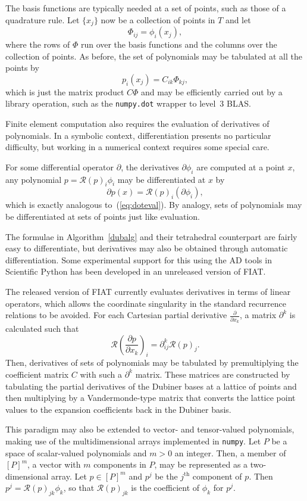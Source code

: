 The basis functions are typically needed at a set of points, such as
those of a quadrature rule.  Let \( \{ x_j \} \) now be a collection of
points in \( T \) and let
\[
  \Phi_{ij} = \phi_i(x_j),
\]
where the rows of \( \Phi \) run over the basis functions and the columns
over the collection of points.  As before, the set of polynomials may
be tabulated at all the points by
\[
p_i(x_j) = C_{ik} \Phi_{kj},
\]
which is just the matrix product \( C \Phi \) and may be efficiently
carried out by a library operation, such as the \texttt{numpy.dot}
wrapper to level~3 BLAS.

Finite element computation also requires the evaluation of derivatives
of polynomials.  In a symbolic context, differentiation presents no
particular difficulty, but working in a numerical context requires some
special care.

For some differential operator \( \partial \), the derivatives \(
\partial \phi_i \) are computed at a point \( x \), any polynomial \(
p = \mathcal{R}(p)_i \phi_i \) may be differentiated at \( x \) by
\[
\partial p(x) = \mathcal{R}(p)_i (\partial \phi_i),
\]
which is exactly analogous to~(\ref{eq:doteval}).  By analogy, sets of
polynomials may be differentiated at sets of points just like evaluation.

The formulae in Algorithm~\ref{dubalg} and their tetrahedral counterpart
are fairly easy to differentiate, but derivatives may also be obtained
through automatic differentiation.  Some experimental support for
this using the AD tools in Scientific Python has been developed in an
unreleased version of FIAT.

The released version of FIAT currently evaluates derivatives in terms
of linear operators, which allows the coordinate singularity in the
standard recurrence relations to be avoided.  For each Cartesian partial
derivative \( \frac{\partial}{\partial x_k} \), a matrix \( \partial^k \)
is calculated such that
\[
\mathcal{R}\left(\frac{\partial p}{\partial x_k}\right)_i
= \partial^k_{ij} \mathcal{R}(p)_j.
\]
Then, derivatives of sets of polynomials may be tabulated by
premultiplying the coefficient matrix \( C \) with such a \( \partial^k
\) matrix.  These matrices are constructed by tabulating the partial
derivatives of the Dubiner bases at a lattice of points and then
multiplying by a Vandermonde-type matrix that converts the lattice point
values to the expansion coefficients back in the Dubiner basis.

This paradigm may also be extended to vector- and tensor-valued
polynomials, making use of the multidimensional arrays implemented in
\texttt{numpy}.  Let \( P \) be a space of scalar-valued polynomials and
\( m > 0 \) an integer.  Then, a member of \( [P]^m \), a vector with \(
m \) components in \( P \), may be represented as a two-dimensional array.
Let \( p \in [P]^m \) and \( p^j \) be the \( j^\mathrm{th} \) component
of \( p \).  Then \( p^j = \mathcal{R}(p)_{jk} \phi_k \), so that \(
\mathcal{R}(p)_{jk} \) is the coefficient of \( \phi_k \) for \( p^j \).

